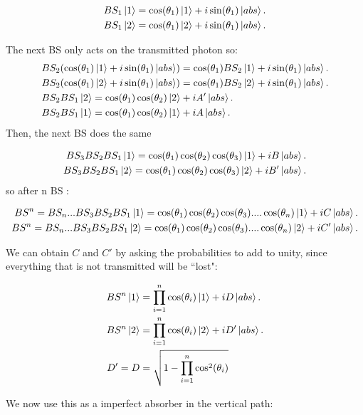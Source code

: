 \documentclass[12pt]{book}
\begin{document}
\begin{align}
BS_{1}\ket{1}=\cos(\theta_{1})\ket{1}+i\sin(\theta_{1})\ket{abs}.\\
BS_{1}\ket{2}=\cos(\theta_{1})\ket{2}+i\sin(\theta_{1})\ket{abs}.
\end{align}

The next BS only acts on the transmitted photon so:
\begin{align}
&BS_{2}(\cos(\theta_{1})\ket{1}+i\sin(\theta_{1})\ket{abs})=\cos(\theta_{1})BS_{2}\ket{1}+i\sin(\theta_{1})\ket{abs}.\\
&BS_{2}(\cos(\theta_{1})\ket{2}+i\sin(\theta_{1})\ket{abs})=\cos(\theta_{1})BS_{2}\ket{2}+i\sin(\theta_{1})\ket{abs}.\\
&BS_{2}BS_{1}\ket{2}=\cos(\theta_{1})\cos(\theta_{2})\ket{2}+i A'\ket{abs}.\\
&BS_{2}BS_{1}\ket{1}=\cos(\theta_{1})\cos(\theta_{2})\ket{1}+i A\ket{abs}.
\end{align}
Then, the next BS does the same

\begin{align}
BS_{3}BS_{2}BS_{1}\ket{1}=\cos(\theta_{1})\cos(\theta_{2})\cos(\theta_{3})\ket{1}+iB\ket{abs}.\\
BS_{3}BS_{2}BS_{1}\ket{2}=\cos(\theta_{1})\cos(\theta_{2})\cos(\theta_{3})\ket{2}+iB'\ket{abs}.
\end{align}
so after n BS :

\begin{align}
BS^{n}=BS_{n}...BS_{3}BS_{2}BS_{1}\ket{1}=\cos(\theta_{1})\cos(\theta_{2})\cos(\theta_{3})....\cos(\theta_{n})\ket{1}+i C\ket{abs}.\\
BS^{n}=BS_{n}...BS_{3}BS_{2}BS_{1}\ket{2}=\cos(\theta_{1})\cos(\theta_{2})\cos(\theta_{3})....\cos(\theta_{n})\ket{2}+i C'\ket{abs}.
\end{align}

We can obtain $C$ and $C'$ by asking the probabilities to add to unity, since everything that is not transmitted will be ``lost":

\begin{align}
BS^{n}\ket{1}&=\prod_{i=1}^{n} \cos(\theta_{i})\ket{1}+i D\ket{abs}.\\
BS^{n}\ket{2}&=\prod_{i=1}^{n} \cos(\theta_{i})\ket{2}+i D'\ket{abs}.\\
D'=D&=\sqrt{1-\prod_{i=1}^{n}\cos^2(\theta_{i})}
\end{align}

We now use this as a imperfect absorber in the vertical path:
\end{document}
